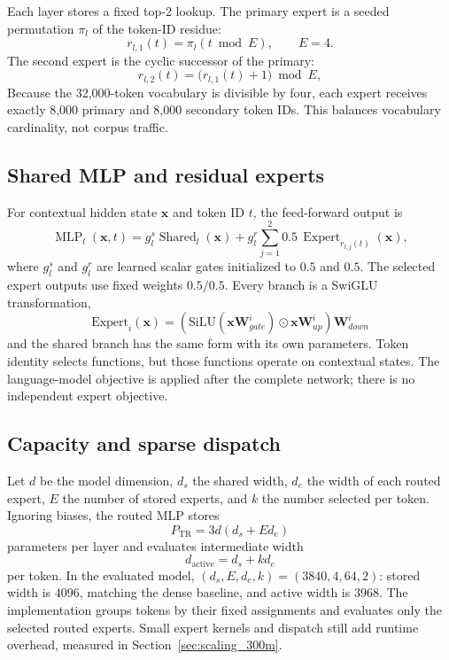 \documentclass[10pt]{article}
\theoremstyle{definition}
\theoremstyle{remark}
\begin{document}
Each layer stores a fixed top-2 lookup. The primary expert is a seeded permutation $\pi_l$ of the token-ID residue:
\begin{equation}
r_{l,1}(t)=\pi_l(t \bmod E), \qquad E=4.
\label{eq:routing}
\end{equation}
The second expert is the cyclic successor of the primary:
\begin{equation}
r_{l,2}(t)=\bigl(r_{l,1}(t)+1\bigr)\bmod E,
\label{eq:secondary_routing}
\end{equation}
Because the 32,000-token vocabulary is divisible by four, each expert receives exactly 8,000 primary and 8,000 secondary token IDs. This balances vocabulary cardinality, not corpus traffic.

\subsection{Shared MLP and residual experts}

For contextual hidden state $\mathbf{x}$ and token ID $t$, the feed-forward output is
\begin{equation}
\operatorname{MLP}_l(\mathbf{x},t)=g^s_l\operatorname{Shared}_l(\mathbf{x})+g^r_l\!\sum_{j=1}^{2}0.5\,\operatorname{Expert}_{r_{l,j}(t)}(\mathbf{x}),
\label{eq:mlp_routed}
\end{equation}
where $g^s_l$ and $g^r_l$ are learned scalar gates initialized to $0.5$ and $0.5$. The selected expert outputs use fixed weights $0.5/0.5$. Every branch is a SwiGLU transformation,
\begin{equation}
\text{Expert}_i(\mathbf{x}) = (\text{SiLU}(\mathbf{x}\mathbf{W}^i_{gate}) \odot \mathbf{x}\mathbf{W}^i_{up})\mathbf{W}^i_{down}
\label{eq:expert}
\end{equation}
and the shared branch has the same form with its own parameters. Token identity selects functions, but those functions operate on contextual states. The language-model objective is applied after the complete network; there is no independent expert objective.

\subsection{Capacity and sparse dispatch}

Let $d$ be the model dimension, $d_s$ the shared width, $d_e$ the width of each routed expert, $E$ the number of stored experts, and $k$ the number selected per token. Ignoring biases, the routed MLP stores
\begin{equation}
P_{\mathrm{TR}}=3d(d_s+E d_e)
\end{equation}
parameters per layer and evaluates intermediate width
\begin{equation}
 d_{\mathrm{active}}=d_s+k d_e
\end{equation}
per token. In the evaluated model, $(d_s,E,d_e,k)=(3840,4,64,2)$: stored width is $4096$, matching the dense baseline, and active width is $3968$. The implementation groups tokens by their fixed assignments and evaluates only the selected routed experts. Small expert kernels and dispatch still add runtime overhead, measured in Section~\ref{sec:scaling_300m}.
\end{document}
